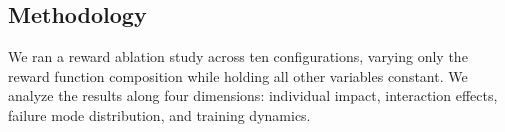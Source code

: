 \subsection{Methodology}
\nestindent

We ran a reward ablation study across ten configurations, varying only the reward function composition while holding all other variables constant.
We analyze the results along four dimensions: individual impact, interaction effects, failure mode distribution, and training dynamics.

    
    
    
    
    

\nestunindent
